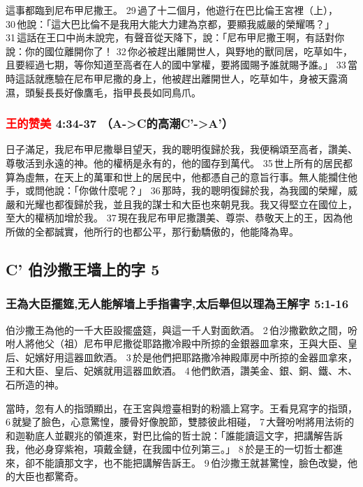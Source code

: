 這事都臨到尼布甲尼撒王。 29 過了十二個月，他遊行在巴比倫王宮裡（上）， 30 他說：「這大巴比倫不是我用大能大力建為京都，要顯我威嚴的榮耀嗎？」 31 這話在王口中尚未說完，有聲音從天降下，說：「尼布甲尼撒王啊，有話對你說：你的國位離開你了！ 32 你必被趕出離開世人，與野地的獸同居，吃草如牛，且要經過七期，等你知道至高者在人的國中掌權，要將國賜予誰就賜予誰。」 33 當時這話就應驗在尼布甲尼撒的身上，他被趕出離開世人，吃草如牛，身被天露滴濕，頭髮長長好像鷹毛，指甲長長如同鳥爪。

\subsubsection{\textcolor{red}{王的赞美} 4:34-37 （A->C的高潮C'->A'）}
日子滿足，我尼布甲尼撒舉目望天，我的聰明復歸於我，我便稱頌至高者，讚美、尊敬活到永遠的神。他的權柄是永有的，他的國存到萬代。 35 世上所有的居民都算為虛無，在天上的萬軍和世上的居民中，他都憑自己的意旨行事。無人能攔住他手，或問他說：「你做什麼呢？」 36 那時，我的聰明復歸於我，為我國的榮耀，威嚴和光耀也都復歸於我，並且我的謀士和大臣也來朝見我。我又得堅立在國位上，至大的權柄加增於我。 37 現在我尼布甲尼撒讚美、尊崇、恭敬天上的王，因為他所做的全都誠實，他所行的也都公平，那行動驕傲的，他能降為卑。


\subsection{C' 伯沙撒王墙上的字 5}
\subsubsection{王為大臣擺筵,无人能解墙上手指書字,太后舉但以理為王解字 5:1-16}
伯沙撒王為他的一千大臣設擺盛筵，與這一千人對面飲酒。 2 伯沙撒歡飲之間，吩咐人將他父（祖）尼布甲尼撒從耶路撒冷殿中所掠的金銀器皿拿來，王與大臣、皇后、妃嬪好用這器皿飲酒。 3 於是他們把耶路撒冷神殿庫房中所掠的金器皿拿來，王和大臣、皇后、妃嬪就用這器皿飲酒。 4 他們飲酒，讚美金、銀、銅、鐵、木、石所造的神。

當時，忽有人的指頭顯出，在王宮與燈臺相對的粉牆上寫字。王看見寫字的指頭， 6 就變了臉色，心意驚惶，腰骨好像脫節，雙膝彼此相碰， 7 大聲吩咐將用法術的和迦勒底人並觀兆的領進來，對巴比倫的哲士說：「誰能讀這文字，把講解告訴我，他必身穿紫袍，項戴金鏈，在我國中位列第三。」 8 於是王的一切哲士都進來，卻不能讀那文字，也不能把講解告訴王。 9 伯沙撒王就甚驚惶，臉色改變，他的大臣也都驚奇。

